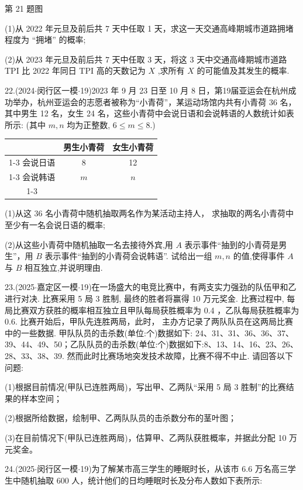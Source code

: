 第 21 题图

(1)从 2022 年元旦及前后共 7 天中任取 1 天，求这一天交通高峰期城市道路拥堵程度为 “拥堵” 的概率;

(2)从 2023 年元旦及前后共 7 天中任取 3 天，将这 3 天中交通高峰期城市道路 TPI 比 2022 年同日 TPI 高的天数记为 $X$ ,求所有 $X$ 的可能值及其发生的概率.

22.(2024$\cdot$闵行区一模$\cdot$19)2023 年 9 月 23 日至 10 月 8 日，第19届亚运会在杭州成功举办，杭州亚运会的志愿者被称为“小青荷”，某运动场馆内共有小青荷 36 名，其中男生 12 名，女生 24 名，这些小青荷中会说日语和会说韩语的人数统计如表所示: (其中 $m,n$ 均为正整数, $6 \leq  m \leq  8$.)

\begin{center}

\begin{tabular}{|c|c|c|}
\hline
\phantom{X} & 男生小青荷 & 女生小青荷 \\
\cline{1-3}
会说日语 & 8 & 12 \\
\cline{1-3}
会说韩语 & $m$ & $n$ \\
\cline{1-3}
\hline
\end{tabular}
\end{center}

(1)从这 36 名小青荷中随机抽取两名作为某活动主持人， 求抽取的两名小青荷中至少有一名会说日语的概率;

(2)从这些小青荷中随机抽取一名去接待外宾,用 $A$ 表示事件“抽到的小青荷是男生”，用 $B$ 表示事件“抽到的小青荷会说韩语”. 试给出一组 $m,n$ 的值,使得事件 $A$ 与 $B$ 相互独立,并说明理由.

23.(2025$\cdot$嘉定区一模$\cdot$19)在一场盛大的电竞比赛中，有两支实力强劲的队伍甲和乙进行对决. 比赛采用 5 局 3 胜制, 最终的胜者将赢得 10 万元奖金. 比赛过程中, 每局比赛双方获胜的概率相互独立且甲队每局获胜概率为 0.4 ，乙队每局获胜概率为 0.6. 比赛开始后，甲队先连胜两局，此时， 主办方记录了两队队员在这两局比赛中的一些数据. 甲队队员的击杀数(单位:个)数据如下: 24、31、31、36、36、37、39、44、49、50；乙队队员的击杀数(单位:个)数据如下:8、13、14、16、23、26、 28、33、38、39. 然而此时比赛场地突发技术故障，比赛不得不中止. 请回答以下问题:

(1)根据目前情况(甲队已连胜两局)，写出甲、乙两队“采用 5 局 3 胜制”的比赛结果的样本空间；

(2)根据所给数据，绘制甲、乙两队队员的击杀数分布的茎叶图；

(3)在目前情况下(甲队已连胜两局)，估算甲、乙两队获胜概率，并据此分配 10 万元奖金。

24.(2025$\cdot$闵行区一模$\cdot$19)为了解某市高三学生的睡眠时长，从该市 6.6 万名高三学生中随机抽取 600 人，统计他们的日均睡眠时长及分布人数如下表所示:


